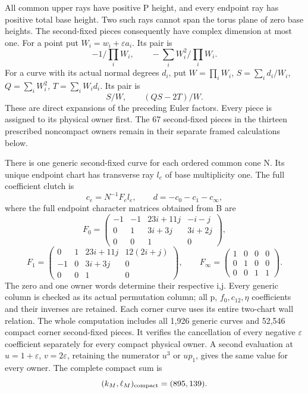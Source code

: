 All common upper rays have positive P height, and every endpoint ray has
positive total base height.  Two such rays cannot span the torus plane
of zero base heights.  The second-fixed pieces consequently have complex
dimension at most one.  For a point put
\(W_i=w_i+\varepsilon a_i\).  Its pair is
\[
-1/\prod_iW_i,\qquad-\sum_iW_i^2/\prod_iW_i.
\]
For a curve with its actual normal degrees \(d_i\), put
\(W=\prod_iW_i\), \(S=\sum_i d_i/W_i\),
\(Q=\sum_iW_i^2\), \(T=\sum_iW_id_i\).  Its pair is
\[
S/W,\qquad(QS-2T)/W.
\]
These are direct expansions of the preceding Euler factors.  Every
piece is assigned to its physical owner first.  The 67 second-fixed
pieces in the thirteen prescribed noncompact owners remain in their
separate framed calculations below.

There is one generic second-fixed curve for each ordered common cone N.
Its unique endpoint chart has transverse ray \(l_e\) of base multiplicity
one.  The full coefficient clutch is
\[
c_e=N^{-1}F_el_e,\qquad d=-c_0-c_1-c_\infty,
\]
where the full endpoint character matrices obtained from B are
\[
F_0=\begin{pmatrix}-1&-1&23i+11j&-i-j\\0&1&3i+3j&3i+2j\\0&0&1&0\end{pmatrix},
\]
\[
F_1=\begin{pmatrix}0&1&23i+11j&12(2i+j)\\-1&0&3i+3j&0\\0&0&1&0\end{pmatrix},
\qquad F_\infty=\begin{pmatrix}1&0&0&0\\0&1&0&0\\0&0&1&1\end{pmatrix}.
\]
The zero and one owner words determine their respective i,j.
Every generic column is checked as its actual
permutation column; all p, \(f_0,c_{12},\eta\) coefficients and their
inverses are retained.  Each corner curve uses its entire two-chart wall
relation.  The whole computation includes all 1,926 generic curves and
52,546 compact corner second-fixed pieces.  It verifies the cancellation
of every negative \(\varepsilon\) coefficient separately for every
compact physical owner.  A second evaluation at \(u=1+\varepsilon\),
\(v=2\varepsilon\), retaining the numerator \(u^3\) or \(up_1\),
gives the same value for every owner.  The complete compact sum is
\[
                         (k_M,\ell_M)_{\rm compact}=(895,139).
\]

